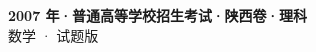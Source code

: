 \documentclass[zihao=-4, a4paper]{ctexart}
\begin{document}
\begin{center}
  {\Large\bfseries 2007 年·普通高等学校招生考试·陕西卷·理科}\\[4pt]
  {\large 数学 · 试题版}
\end{center}
\medskip
{}

\end{document}
